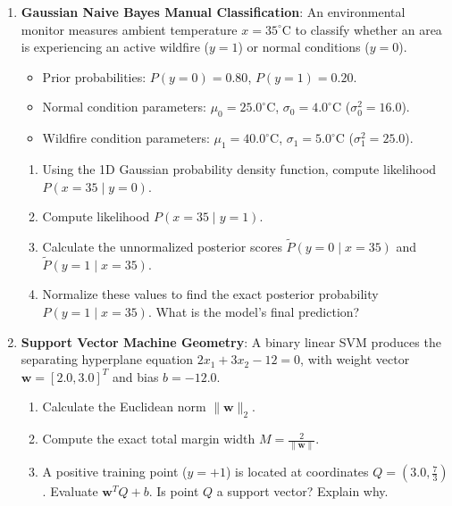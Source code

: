 \begin{checkyourself}
\begin{enumerate}
    \item \textbf{Gaussian Naive Bayes Manual Classification}:
    An environmental monitor measures ambient temperature $x = 35^\circ\text{C}$ to classify whether an area is experiencing an active wildfire ($y = 1$) or normal conditions ($y = 0$).
    \begin{itemize}
        \item Prior probabilities: $P(y = 0) = 0.80$, $P(y = 1) = 0.20$.
        \item Normal condition parameters: $\mu_0 = 25.0^\circ\text{C}$, $\sigma_0 = 4.0^\circ\text{C}$ ($\sigma_0^2 = 16.0$).
        \item Wildfire condition parameters: $\mu_1 = 40.0^\circ\text{C}$, $\sigma_1 = 5.0^\circ\text{C}$ ($\sigma_1^2 = 25.0$).
    \end{itemize}
    \begin{enumerate}[label=(\alph*)]
        \item Using the 1D Gaussian probability density function, compute likelihood $P(x=35 \mid y=0)$.
        \item Compute likelihood $P(x=35 \mid y=1)$.
        \item Calculate the unnormalized posterior scores $\tilde{P}(y=0 \mid x=35)$ and $\tilde{P}(y=1 \mid x=35)$.
        \item Normalize these values to find the exact posterior probability $P(y=1 \mid x=35)$. What is the model's final prediction?
    \end{enumerate}

    \item \textbf{Support Vector Machine Geometry}:
    A binary linear SVM produces the separating hyperplane equation $2 x_1 + 3 x_2 - 12 = 0$, with weight vector $\mathbf{w} = [2.0, 3.0]^T$ and bias $b = -12.0$.
    \begin{enumerate}[label=(\alph*)]
        \item Calculate the Euclidean norm $\|\mathbf{w}\|_2$.
        \item Compute the exact total margin width $M = \frac{2}{\|\mathbf{w}\|}$.
        \item A positive training point ($y = +1$) is located at coordinates $Q = (3.0, \frac{7}{3})$. Evaluate $\mathbf{w}^T Q + b$. Is point $Q$ a support vector? Explain why.
    \end{enumerate}


\end{enumerate}
\end{checkyourself}
